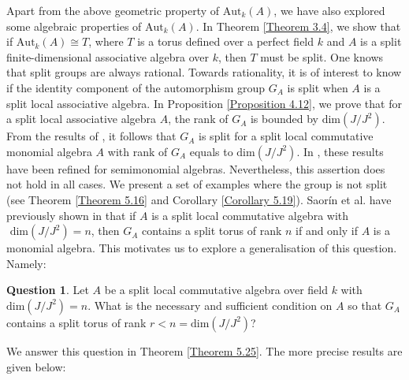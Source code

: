 \documentclass[12pt]{amsart}
\theoremstyle{definition}
\newtheorem{question}[theorem]{Question}
\numberwithin{equation}{section}
\begin{document}
Apart from the above geometric property of $\text{Aut}_k(A)$, we have also explored some algebraic properties of $\text{Aut}_k(A)$. In Theorem \ref{Theorem 3.4}, we show that if $\text{Aut}_k(A)\cong T$, where $T$ is a torus defined over a perfect field $k$ and $A$ is a split finite-dimensional associative algebra over $k$, then $T$ must be split. One knows that split groups are always rational. Towards rationality, it is of interest to know if the identity component of the automorphism group $G_A$ is split when $A$ is a split local associative algebra. In Proposition \ref{Proposition 4.12}, we prove that for a split local associative algebra $A$, the rank of $G_A$ is bounded by $\text{dim}(J/J^2)$.  From the results of \cite{AS1}, it follows that $G_A$ is split for a split local commutative monomial algebra $A$ with rank of $G_A$ equals to $\text{dim}(J/J^2)$. In \cite{AS2}, these results have been refined for semimonomial algebras. Nevertheless, this assertion does not hold in all cases. We present a set of examples where the group is not split (see Theorem \ref{Theorem 5.16} and Corollary \ref{Corollary 5.19}). Saor\'in et al. have previously shown in \cite{AS1} that if $A$ is a split local commutative algebra with $\text{ dim}(J/J^2)=n$, then $G_A$ contains a split torus of rank $n$ if and only if $A$ is a monomial algebra. This motivates us to explore a generalisation of this question. Namely:
\vskip2mm
\begin{question}
Let $A$ be a split local commutative algebra over field $k$ with $\text{dim}(J/J^2)=n$. What is the necessary and sufficient condition on $A$ so that $G_A$ contains a split torus of rank $r< n=\text{dim}(J/J^2)$? 
\end{question}
\vskip2mm
\noindent
We answer this question in Theorem \ref{Theorem 5.25}. The more precise results are given below:
\vspace{0.2in}
\end{document}
